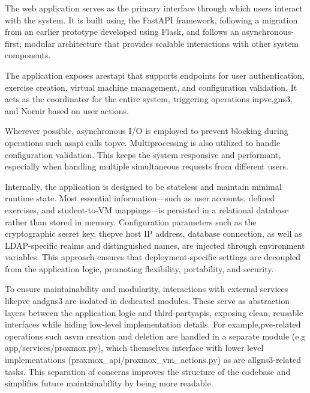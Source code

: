         The web application serves as the primary interface through which users interact with the system. It is built using the FastAPI 
        framework, following a migration from an earlier prototype developed using Flask, and follows an asynchronous-first, modular 
        architecture that provides scalable interactions with other system components.

        The application exposes a\ac{rest}\ac{api} that supports endpoints for user authentication, exercise creation, virtual 
        machine management, and configuration validation. It acts as the coordinator for the entire system, triggering operations 
        in\ac{pve},\ac{gns3}, and Nornir based on user actions.

        Wherever possible, asynchronous I/O is employed to prevent blocking during operations such as\ac{api} calls to\ac{pve}.
        Multiprocessing is also utilized to handle configuration validation. This keeps the system responsive and performant, 
        especially when handling multiple simultaneous requests from different users.

        Internally, the application is designed to be stateless and maintain minimal runtime state.  Most essential information—such 
        as user accounts, defined exercises, and student-to-VM mappings—is persisted in a relational database rather than stored in 
        memory. Configuration parameters such as the cryptographic secret key, the\ac{pve} host IP address, database connection, as 
        well as LDAP-specific realms and distinguished names, are injected through environment variables. This approach ensures that 
        deployment-specific settings are decoupled from the application logic, promoting flexibility, portability, and security.

        To ensure maintainability and modularity, interactions with external services like\ac{pve} and\ac{gns3} are isolated in 
        dedicated modules. These serve as abstraction layers between the application logic and third-party\ac{api}s, exposing clean, 
        reusable interfaces while hiding low-level implementation details. For example,\ac{pve}-related operations such as\ac{vm} 
        creation and deletion are handled in a separate module (e.g app/services/proxmox.py), which themselves interface with lower level 
        implementations (proxmox_api/proxmox_vm_actions.py) as are all\ac{gns3}-related tasks. This separation of concerns improves 
        the structure of the codebase and simplifies future maintainability by being more readable.

